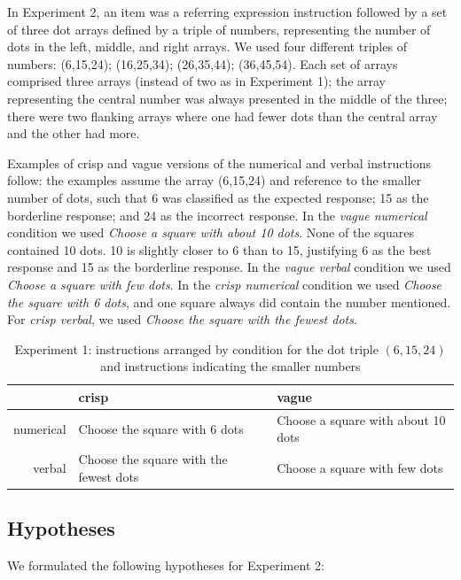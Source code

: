 \documentclass[%
man,		%
floatsintext,%
apacite%
]{apa6} %
\begin{document}
In Experiment 2, an item was a referring expression instruction followed by a set of three dot arrays defined by a triple of numbers, representing the number of dots in the left, middle, and right arrays. We used four different triples of numbers: (6,15,24); (16,25,34); (26,35,44); (36,45,54). Each set of arrays comprised three arrays (instead of two as in Experiment 1); the array representing the central number was always presented in the middle of the three; there were two flanking arrays where one had fewer dots than the central array and the other had more.

Examples of crisp and vague versions of the numerical and verbal instructions follow: the examples assume the array (6,15,24) and reference to the smaller number of dots, such that 6 was classified as the expected response; 15 as the borderline response; and 24 as the incorrect response. In the {\em vague numerical} condition we used \emph{Choose a square with about 10 dots}. None of the squares contained 10 dots. 10 is slightly closer to 6 than to 15, justifying 6 as the best response and 15 as the borderline response. In the {\em vague verbal} condition we used \emph{Choose a square with few dots}. In the {\em crisp numerical} condition we used \emph{Choose the square with 6 dots}, and one square always did contain the number mentioned. For {\em crisp verbal}, we used \emph{Choose the square with the fewest dots}.

\begin{table}[htbp]
\caption{Experiment 1: instructions arranged by condition for the dot triple $(6,15,24)$ and instructions indicating the smaller numbers}
\label{instre3}
\begin{tabular}{rll}
&crisp&vague\\
\midrule
numerical	&	Choose the square with 6 dots 			& 	Choose a square with about 10 dots	\\
verbal	&	Choose the square with the fewest dots	&	Choose a square with few dots		\\
\midrule
\end{tabular}
\end{table}

\subsection{Hypotheses} %
\noindent We formulated the following hypotheses for Experiment 2:
\end{document}
